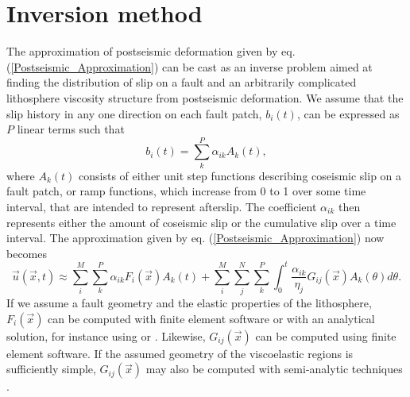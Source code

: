 \documentclass[extra]{gji}
\begin{document}
\section{Inversion method}
The approximation of postseismic deformation given by eq.
(\ref{Postseismic_Approximation}) can be cast as an inverse problem
aimed at finding the distribution of slip on a fault and an
arbitrarily complicated lithosphere viscosity structure from
postseismic deformation. We assume that the slip history in any one
direction on each fault patch, $b_i(t)$, can be expressed as $P$ linear
terms such that
\begin{equation}
  b_i(t) = \sum_k^P \alpha_{ik}A_k(t),
\end{equation}
where $A_k(t)$ consists of either unit step functions describing
coseismic slip on a fault patch, or ramp functions, which increase
from 0 to 1 over some time interval, that are intended to represent
afterslip.  The coefficient $\alpha_{ik}$ then represents either the
amount of coseismic slip or the cumulative slip over a time interval.
The approximation given by eq. (\ref{Postseismic_Approximation}) now
becomes
\begin{equation}\label{Postseismic_Approximation2}
  \vec{u}(\vec{x},t) \approx
  \sum_i^M\sum_k^P\alpha_{ik}F_i(\vec{x})A_k(t) +
  \sum_i^M\sum_j^N\sum_k^P\int_0^t\frac{\alpha_{ik}}{\eta_j}G_{ij}(\vec{x})A_k(\theta)d\theta.
\end{equation}
If we assume a fault geometry and the elastic properties of the
lithosphere, $F_i(\vec{x})$ can be computed with finite element
software or with an analytical solution, for instance using
\citet{O1992} or \citet{M2007}. Likewise, $G_{ij}(\vec{x})$ can be
computed using finite element software.  If the assumed geometry of
the viscoelastic regions is sufficiently simple, $G_{ij}(\vec{x})$ may
also be computed with semi-analytic techniques
\citep[e.g.][]{P1997,FM2006,BF2010}.
\end{document}
